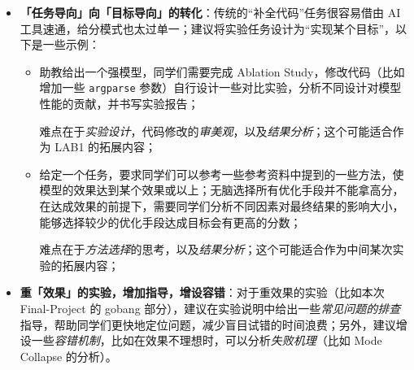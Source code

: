 \documentclass[oneside]{ctexbook}
\begin{document}
\begin{itemize}
    \item \textbf{「任务导向」向「目标导向」的转化}：传统的“补全代码”任务很容易借由 AI 工具速通，给分模式也太过单一；建议将实验任务设计为“实现某个目标”，以下是一些示例：
    \begin{itemize}
        \item 助教给出一个强模型，同学们需要完成 Ablation Study，修改代码（比如增加一些 \verb|argparse| 参数）自行设计一些对比实验，分析不同设计对模型性能的贡献，并书写实验报告；
        
        难点在于\textit{实验设计}，代码修改的\textit{审美观}，以及\textit{结果分析}；这个可能适合作为 LAB1 的拓展内容；
        \item 给定一个任务，要求同学们可以参考一些参考资料中提到的一些方法，使模型的效果达到某个效果或以上；无脑选择所有优化手段并不能拿高分，在达成效果的前提下，需要同学们分析不同因素对最终结果的影响大小，能够选择较少的优化手段达成目标会有更高的分数；
        
        难点在于\textit{方法选择}的思考，以及\textit{结果分析}；这个可能适合作为中间某次实验的拓展内容；
    \end{itemize}
    \item \textbf{重「效果」的实验，增加指导，增设容错}：对于重效果的实验（比如本次 Final-Project 的 gobang 部分），建议在实验说明中给出一些\textit{常见问题的排查}指导，帮助同学们更快地定位问题，减少盲目试错的时间浪费；另外，建议增设一些\textit{容错机制}，比如在效果不理想时，可以分析\textit{失败机理}（比如 Mode Collapse 的分析）。
\end{itemize}
\end{document}
